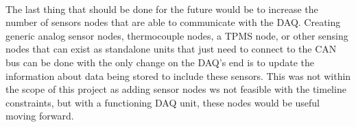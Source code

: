 \paragraph{}
The last thing that should be done for the future would be to increase the number of sensors nodes that are able to communicate with the DAQ.
Creating generic analog sensor nodes, thermocouple nodes, a TPMS node, or other sensing nodes that can exist as standalone units that just need to connect to the CAN bus can be done with the only change on the DAQ's end is to update the information about data being stored to include these sensors.
This was not within the scope of this project as adding sensor nodes ws not feasible with the timeline constraints, but with a functioning DAQ unit, these nodes would be useful moving forward.